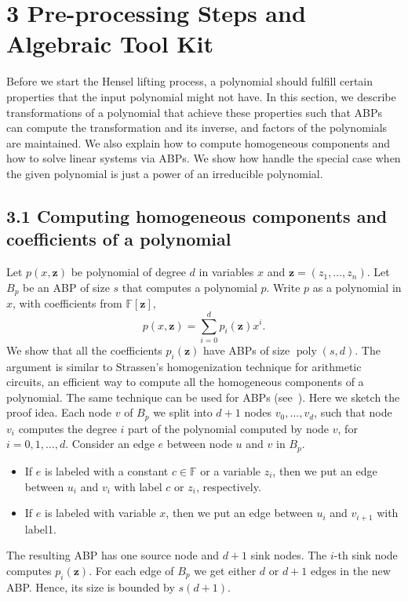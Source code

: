 \section*{3 Pre-processing Steps and Algebraic Tool Kit}
Before we start the Hensel lifting process, a polynomial should fulfill certain properties that the input polynomial might not have. In this section, we describe transformations of a polynomial that achieve these properties such that ABPs can compute the transformation and its inverse, and factors of the polynomials are maintained.
We also explain how to compute homogeneous components and how to solve linear systems via ABPs. We show how handle the special case when the given polynomial is just a power of an irreducible polynomial.
\subsection*{3.1 Computing homogeneous components and coefficients of a polynomial}
Let $p(x,\mathbf z)$ be polynomial of degree $d$ in variables $x$ and $\mathbf z=(z_1,\ldots,z_n)$. Let $B_p$ be an ABP of size $s$ that computes a polynomial $p$. Write $p$ as a polynomial in $x$, with coefficients from $\mathbb F[\mathbf z]$,
\[p(x,\mathbf z)=\sum_{i=0}^dp_i(\mathbf z)x^i.\]
We show that all the coefficients $p_i(\mathbf z)$ have ABPs of size $\operatorname{poly}(s,d)$.
The argument is similar to Strassen's homogenization technique for arithmetic circuits, an efficient way to compute all the homogeneous components of a polynomial. The same technique can be used for ABPs (see~\cite[Lemma 5.2 and Remark]{ref17}). Here we sketch the proof idea.
Each node $v$ of $B_p$ we split into $d+1$ nodes $v_0,\ldots,v_d$, such that node $v_i$ computes the degree $i$ part of the polynomial computed by node $v$, for $i=0,1,\ldots,d$. Consider an edge $e$ between node $u$ and $v$ in $B_p$.
\begin{itemize}\item If $e$ is labeled with a constant $c\in\mathbb F$ or a variable $z_i$, then we put an edge between $u_i$ and $v_i$ with label $c$ or $z_i$, respectively.\item If $e$ is labeled with variable $x$, then we put an edge between $u_i$ and $v_{i+1}$ with label1.\end{itemize}
The resulting ABP has one source node and $d+1$ sink nodes. The $i$-th sink node computes $p_i(\mathbf z)$.
For each edge of $B_p$ we get either $d$ or $d+1$ edges in the new ABP. Hence, its size is bounded by $s(d+1)$.
\setcounter{nttheorem}{3}
